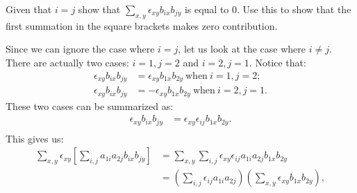 \begin{exercise}
Given that $i=j$ show that $\sum_{x,y} \epsilon_{xy}  b_{ix}b_{jy}$  is equal to 0. Use this to show that the first summation in the square brackets makes zero contribution.
\end{exercise}
Since we can ignore the case where $i=j$, let us look at the case where $i \neq j$.  There are actually two cases: $i=1, j=2$ and $i=2, j=1$.  Notice that:
\begin{align*}
 \epsilon_{xy} b_{ix}b_{jy}&=\epsilon_{xy} b_{1x}b_{2y}~\text{when}~i=1,j=2;\\
 \epsilon_{xy} b_{ix}b_{jy}&= -\epsilon_{xy} b_{1x}b_{2y}~\text{when}~i=2,j=1.
\end{align*}
These two cases can be summarized as:
\begin{align*}
 \epsilon_{xy} b_{ix}b_{jy}&=\epsilon_{xy}\epsilon_{ij} b_{1x}b_{2y}.\\
\end{align*}
This gives us:
\begin{align*}
\sum_{x,y} \epsilon_{xy} \left[ \sum_{i,j}  a_{1i}a_{2j} b_{ix}b_{jy}\right]&= \sum_{x,y}  \sum_{i,j} \epsilon_{xy}\epsilon_{ij}   a_{1i}a_{2j} b_{1x}b_{2y}\\
&=  \left(\sum_{i,j}\epsilon_{ij}   a_{1i}a_{2j}\right)\left(\sum_{x,y}  \epsilon_{xy} b_{1x}b_{2y}\right),
\end{align*}
